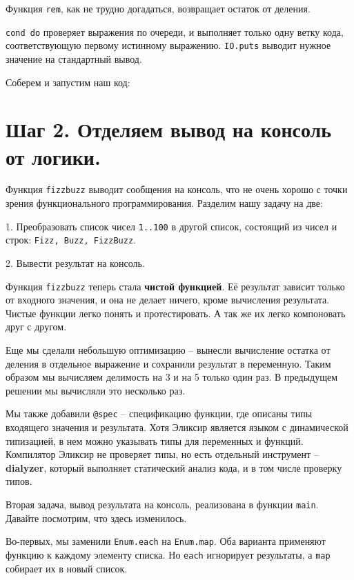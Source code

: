 Функция \texttt{rem}, как не трудно догадаться, возвращает остаток от деления.

\texttt{cond do} проверяет выражения по очереди, и выполняет только одну ветку кода, соответствующую первому истинному выражению. \texttt{IO.puts} выводит нужное значение на стандартный вывод.

Соберем и запустим наш код:


\section{Шаг 2. Отделяем вывод на консоль от логики.}

Функция \texttt{fizzbuzz} выводит сообщения на консоль, что не очень хорошо с точки зрения функционального программирования. Разделим нашу задачу на две:

1. Преобразовать список чисел \texttt{1..100} в другой список, состоящий из чисел и строк: \texttt{Fizz, Buzz, FizzBuzz}.

2. Вывести результат на консоль.



Функция \texttt{fizzbuzz} теперь стала \textbf{чистой функцией}. Её результат зависит только от входного значения, и она не делает ничего, кроме вычисления результата. Чистые функции легко понять и протестировать. А так же их легко компоновать друг с другом.

Еще мы сделали небольшую оптимизацию -- вынесли вычисление остатка от деления в отдельное выражение и сохранили результат в переменную. Таким образом мы вычисляем делимость на 3 и на 5 только один раз. В предыдущем решении мы вычисляли это несколько раз.

Мы также добавили \texttt{@spec} -- спецификацию функции, где описаны типы входящего значения и результата. Хотя Эликсир является языком с динамической типизацией, в нем можно указывать типы для переменных и функций. Компилятор Эликсир не проверяет типы, но есть отдельный инструмент -- \textbf{dialyzer}, который выполняет статический анализ кода, и в том числе проверку типов.

Вторая задача, вывод результата на консоль, реализована в функции \texttt{main}. Давайте посмотрим, что здесь изменилось. 

Во-первых, мы заменили \texttt{Enum.each} на \texttt{Enum.map}. Оба варианта применяют функцию к каждому элементу списка. Но \texttt{each} игнорирует результаты, а \texttt{map} собирает их в новый список.

